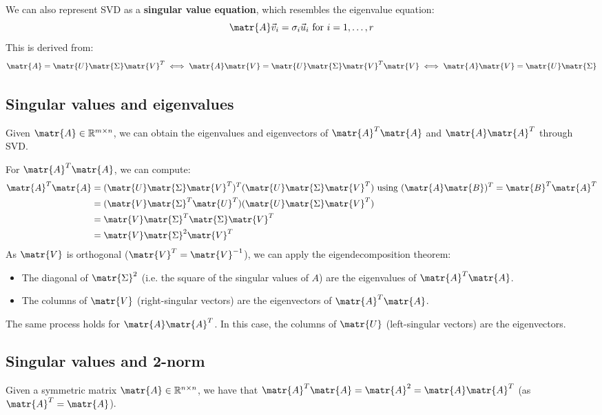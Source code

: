 We can also represent SVD as a \textbf{singular value equation}, which resembles the eigenvalue equation:
\[  \matr{A}\vec{v}_i = \sigma_i\vec{u}_i \text{ for } i = 1, \dots, r \]
This is derived from:
\[ 
    \matr{A} = \matr{U}\matr{\Sigma}\matr{V}^T 
        \iff \matr{A}\matr{V} = \matr{U}\matr{\Sigma}\matr{V}^T\matr{V} 
        \iff \matr{A}\matr{V} = \matr{U}\matr{\Sigma}
\]

\subsection{Singular values and eigenvalues}
Given $\matr{A} \in \mathbb{R}^{m \times n}$, we can obtain the eigenvalues and eigenvectors 
of $\matr{A}^T\matr{A}$ and $\matr{A}\matr{A}^T$ through SVD.

For $\matr{A}^T\matr{A}$, we can compute:
\[
\begin{split}
    \matr{A}^T\matr{A} & = (\matr{U}\matr{\Sigma}\matr{V}^T)^T(\matr{U}\matr{\Sigma}\matr{V}^T) \text{ using } (\matr{A}\matr{B})^T = \matr{B}^T\matr{A}^T \\
        & = (\matr{V}\matr{\Sigma}^T\matr{U}^T)(\matr{U}\matr{\Sigma}\matr{V}^T) \\
        & = \matr{V}\matr{\Sigma}^T\matr{\Sigma}\matr{V}^T \\
        & = \matr{V}\matr{\Sigma}^2\matr{V}^T
\end{split}    
\]
As $\matr{V}$ is orthogonal ($\matr{V}^T = \matr{V}^{-1}$), we can apply the eigendecomposition theorem:
\begin{itemize}
    \item The diagonal of $\matr{\Sigma}^2$ (i.e. the square of the singular values of $A$) are the eigenvalues of $\matr{A}^T\matr{A}$.
    \item The columns of $\matr{V}$ (right-singular vectors) are the eigenvectors of $\matr{A}^T\matr{A}$.
\end{itemize}

The same process holds for $\matr{A}\matr{A}^T$. In this case, the columns of $\matr{U}$ (left-singular vectors) are the eigenvectors.


\subsection{Singular values and 2-norm}
Given a symmetric matrix $\matr{A} \in \mathbb{R}^{n \times n}$, 
we have that $\matr{A}^T\matr{A} = \matr{A}^2 = \matr{A}\matr{A}^T$ (as $\matr{A}^T = \matr{A}$).


